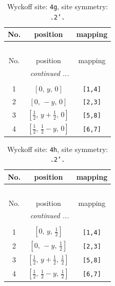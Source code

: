 \documentclass[fleqn,8pt]{jsarticle}
\begin{document}
\renewcommand{\arraystretch}{1.2}
\begin{longtable}{ccc}
\caption{Wyckoff site: {\tt 4g}, site symmetry: {\tt .2'.}}
 \\
 \hline \hline
No. & position & mapping \\ \hline \endfirsthead

\multicolumn{2}{l}{\tablename\ \thetable{}} \\
 \hline \hline
No. & position & mapping \\ \hline \endhead

 \hline \hline
\multicolumn{2}{r}{\footnotesize\it continued ...} \\ \endfoot

 \hline \hline
\multicolumn{2}{r}{} \\ \endlastfoot

1 & $\left[ 0,\, y,\, 0 \right]$ & {\tt [1,4]} \\ \hline
2 & $\left[ 0,\, - y,\, 0 \right]$ & {\tt [2,3]} \\ \hline
3 & $\left[ \frac{1}{2},\, y + \frac{1}{2},\, 0 \right]$ & {\tt [5,8]} \\ \hline
4 & $\left[ \frac{1}{2},\, \frac{1}{2} - y,\, 0 \right]$ & {\tt [6,7]} \\
\end{longtable}
\renewcommand{\arraystretch}{1.2}
\begin{longtable}{ccc}
\caption{Wyckoff site: {\tt 4h}, site symmetry: {\tt .2'.}}
 \\
 \hline \hline
No. & position & mapping \\ \hline \endfirsthead

\multicolumn{2}{l}{\tablename\ \thetable{}} \\
 \hline \hline
No. & position & mapping \\ \hline \endhead

 \hline \hline
\multicolumn{2}{r}{\footnotesize\it continued ...} \\ \endfoot

 \hline \hline
\multicolumn{2}{r}{} \\ \endlastfoot

1 & $\left[ 0,\, y,\, \frac{1}{2} \right]$ & {\tt [1,4]} \\ \hline
2 & $\left[ 0,\, - y,\, \frac{1}{2} \right]$ & {\tt [2,3]} \\ \hline
3 & $\left[ \frac{1}{2},\, y + \frac{1}{2},\, \frac{1}{2} \right]$ & {\tt [5,8]} \\ \hline
4 & $\left[ \frac{1}{2},\, \frac{1}{2} - y,\, \frac{1}{2} \right]$ & {\tt [6,7]} \\
\end{longtable}
\end{document}
